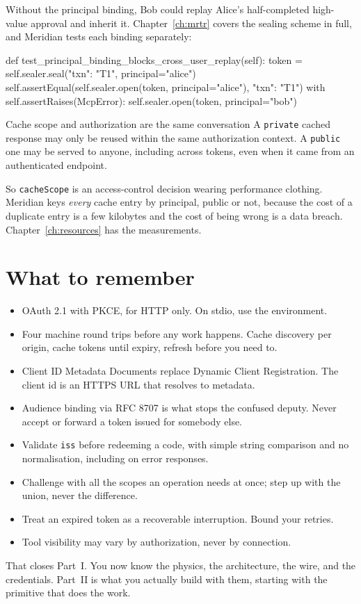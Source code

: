 Without the principal binding, Bob could replay Alice's half-completed
high-value approval and inherit it. Chapter~\ref{ch:mrtr} covers the sealing
scheme in full, and Meridian tests each binding separately:

\begin{py}
def test_principal_binding_blocks_cross_user_replay(self):
    token = self.sealer.seal({"txn": "T1"}, principal="alice")
    self.assertEqual(self.sealer.open(token, principal="alice"),
                     {"txn": "T1"})
    with self.assertRaises(McpError):
        self.sealer.open(token, principal="bob")
\end{py}

\begin{notebox}{Cache scope and authorization are the same conversation}
A \texttt{private} cached response may only be reused within the same
authorization context. A \texttt{public} one may be served to anyone, including
across tokens, even when it came from an authenticated endpoint.

So \texttt{cacheScope} is an access-control decision wearing performance
clothing. Meridian keys \emph{every} cache entry by principal, public or not,
because the cost of a duplicate entry is a few kilobytes and the cost of being
wrong is a data breach. Chapter~\ref{ch:resources} has the measurements.
\end{notebox}

\section{What to remember}

\begin{itemize}[leftmargin=1.6em, itemsep=3pt]
\item OAuth 2.1 with PKCE, for HTTP only. On stdio, use the environment.
\item Four machine round trips before any work happens. Cache discovery per
origin, cache tokens until expiry, refresh before you need to.
\item Client ID Metadata Documents replace Dynamic Client Registration. The
client id is an HTTPS URL that resolves to metadata.
\item Audience binding via RFC 8707 is what stops the confused deputy. Never
accept or forward a token issued for somebody else.
\item Validate \texttt{iss} before redeeming a code, with simple string
comparison and no normalisation, including on error responses.
\item Challenge with all the scopes an operation needs at once; step up with the
union, never the difference.
\item Treat an expired token as a recoverable interruption. Bound your retries.
\item Tool visibility may vary by authorization, never by connection.
\end{itemize}

That closes Part~I. You now know the physics, the architecture, the wire, and
the credentials. Part~II is what you actually build with them, starting with
the primitive that does the work.
